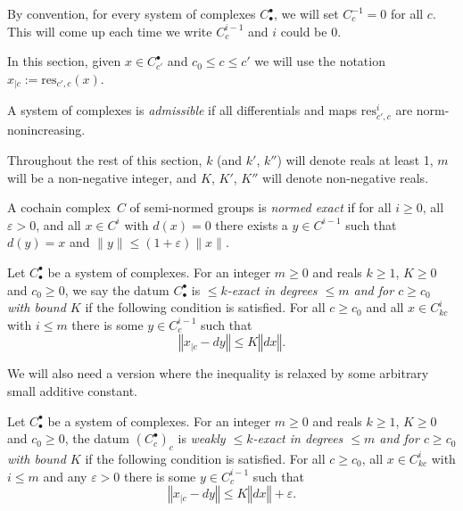 By convention, for every system of complexes $C_\bullet^\bullet$,
we will set $C^{-1}_c = 0$ for all $c$.
This will come up each time we write $C^{i-1}_c$ and $i$ could be $0$.

In this section, given $x ∈ C^•_{c'}$ and $c_0\leq c ≤ c'$ we will use the notation
$x_{|c} := \mathrm{res}_{c', c}(x)$.

\begin{definition}
  \label{admissible}
  \leanok
  A system of complexes is \emph{admissible}
  if all differentials and maps $\mathrm{res}_{c',c}^i$ are norm-nonincreasing.
\end{definition}

Throughout the rest of this section, $k$ (and $k'$, $k''$) will denote reals at least 1,
$m$ will be a non-negative integer, and $K$, $K'$, $K''$ will denote non-negative reals.

\begin{definition}
  \label{norm_exact_complex}
  \leanok
  A cochain complex~$C$ of semi-normed groups is \emph{normed exact} if
  for all $i \ge 0$, all $\varepsilon > 0$, and all $x \in C^i$ with $d(x) = 0$
  there exists a $y \in C^{i-1}$ such that $d(y) = x$ and $\|y\| \le (1 + \varepsilon)\|x\|$.
\end{definition}

\begin{definition}
  \label{is_bounded_exact}
  \leanok
  Let $C_\bullet^\bullet$ be a system of complexes.
  For an integer $m\geq 0$ and reals $k \ge 1$, $K \ge 0$ and $c_0 \ge 0$,
  we say the datum $C_\bullet^\bullet$ is
  \emph{$\leq k$-exact in degrees $\leq m$ and for $c\geq c_0$ with bound $K$} if the following condition is satisfied.
  For all $c\geq c_0$ and all $x\in C_{kc}^i$ with $i\leq m$
  there is some $y\in C_c^{i-1}$ such that
  \[
    ‖x_{|c} - dy‖ ≤ K ‖dx‖.
  \]
\end{definition}

We will also need a version where the inequality is relaxed by some arbitrary small additive constant.

\begin{definition}
  \label{is_weak_bounded_exact}
  \leanok
  Let $C_\bullet^\bullet$ be a system of complexes.
  For an integer $m\geq 0$ and reals $k \ge 1$, $K \ge 0$ and $c_0 \ge 0$,
  the datum $(C_c^\bullet)_c$ is
  \emph{weakly $\leq k$-exact in degrees $\leq m$ and for $c\geq c_0$ with bound $K$} if the following condition is satisfied.
  For all $c\geq c_0$, all $x\in C_{kc}^i$ with $i\leq m$ and any $ε > 0$
  there is some $y\in C_c^{i-1}$ such that
  \[
    ‖x_{|c} - dy‖ ≤ K ‖dx‖ + ε.
  \]
\end{definition}

